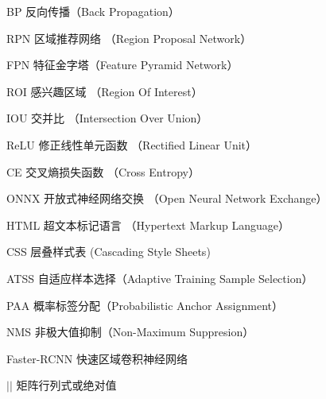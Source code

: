 
\begin{denotation}[3cm]
  \item[BP] 反向传播（Back Propagation）
  \item[RPN] 区域推荐网络 （Region Proposal Network）
  \item[FPN] 特征金字塔（Feature Pyramid Network）
  \item[ROI] 感兴趣区域 （Region Of Interest）
  \item[IOU] 交并比 （Intersection Over Union）
  \item[ReLU] 修正线性单元函数 （Rectified Linear Unit）
  \item[CE] 交叉熵损失函数 （Cross Entropy）
  \item[ONNX] 开放式神经网络交换 （Open Neural Network Exchange）
  \item[HTML] 超文本标记语言 （Hypertext Markup Language）
  \item[CSS] 层叠样式表 (Cascading Style Sheets)
  \item[ATSS] 自适应样本选择（Adaptive Training Sample Selection）
  \item[PAA] 概率标签分配（Probabilistic Anchor Assignment）
  \item[NMS] 非极大值抑制（Non-Maximum Suppresion）
  \item[Faster-RCNN] 快速区域卷积神经网络
  \item[$\left| {} \right|$] 矩阵行列式或绝对值
\end{denotation}



